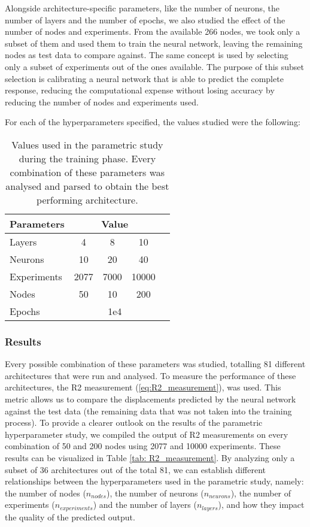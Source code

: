 Alongside architecture-specific parameters, like the number of neurons, the number of layers and the number of epochs, we also studied the effect of the number of nodes and experiments. From the available 266 nodes, we took only a subset of them and used them to train the neural network, leaving the remaining nodes as test data to compare against. The same concept is used by selecting only a subset of experiments out of the ones available. The purpose of this subset selection is calibrating a neural network that is able to predict the complete response, reducing the computational expense without losing accuracy by reducing the number of nodes and experiments used. 

For each of the hyperparameters specified, the values studied were the following:

\begin{table}[!hb]
  \centering
\begin{tabular}{l|cccc}
\textbf{Parameters} & \multicolumn{3}{c}{\textbf{Value}} \\ \hline
Layers              & 4      & 8       & 10            \\
Neurons             & 10     & 20      & 40           \\
Experiments         & 2077    & 7000    & 10000      \\
Nodes               & 50     & 10      & 200           \\
Epochs              &  \multicolumn{3}{c}{1e4}        
\end{tabular}
  \caption{Values used in the parametric study during the training phase. Every combination of these parameters was analysed and parsed to obtain the best performing architecture.}
\end{table}

\subsubsection{Results}


Every possible combination of these parameters was studied, totalling 81 different architectures that were run and analysed. To measure the performance of these architectures, the R2 measurement (\ref{eq:R2_measurement}), was used. This metric allows us to compare the displacements predicted by the neural network against the test data (the remaining data that was not taken into the training process). To provide a clearer outlook on the results of the parametric hyperparameter study, we compiled the output of R2 measurements on every combination of 50 and 200 nodes using 2077 and 10000 experiments. These results can be visualized in Table \ref{tab: R2_measurement}. By analyzing only a subset of 36 architectures out of the total 81, we can establish different relationships between the hyperparameters used in the parametric study, namely: the number of nodes ($n_{nodes}$), the number of neurons ($n_{neurons}$), the number of experiments ($n_{experiments}$) and the number of layers ($n_{layers}$), and how they impact the quality of the predicted output. 


